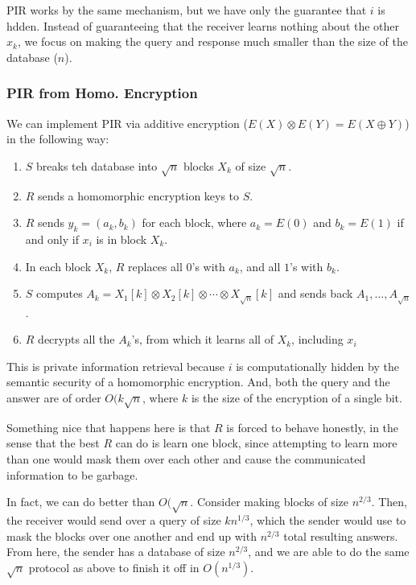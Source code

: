 \documentclass[11pt]{article}
\begin{document}
PIR works by the same mechanism, but we have only the guarantee that \(i\) is hdden.
Instead of guaranteeing that the receiver learns nothing about the other \(x_k\), 
we focus on making the query and response much smaller than the size of the database (\(n\)).

\subsubsection{PIR from Homo. Encryption}
We can implement PIR via additive encryption (\(E(X)\otimes E(Y) = E(X\oplus Y)\)) in the following way:
\begin{enumerate}
\item \(S\) breaks teh database into \(\sqrt{n}\) blocks \(X_k\) of size \(\sqrt{n}\).
\item \(R\) sends a homomorphic encryption keys to \(S\). 
\item \(R\) sends \(y_k = (a_k,b_k)\) for each block, where \(a_k=E(0)\) and \(b_k=E(1)\) if and only if \(x_i\) is in block \(X_k\).
\item In each block \(X_k\), \(R\) replaces all \(0\)'s with \(a_k\), and all \(1\)'s with \(b_k\).
\item \(S\) computes \(A_k = X_1[k]\otimes X_2[k]\otimes\cdots\otimes X_{\sqrt{n}}[k]\) and sends back \(A_1,\ldots,A_{\sqrt{n}}\).
\item \(R\) decrypts all the \(A_k\)'s, from which it learns all of \(X_k\), including \(x_i\)
\end{enumerate}

This is private information retrieval because \(i\) is computationally hidden by the semantic security of a homomorphic encryption.
And, both the query and the answer are of order \(O(k\sqrt{n}\), where \(k\) is the size of the encryption of a single bit.

Something nice that happens here is that \(R\) is forced to behave honestly, in the sense that the best \(R\) can do is learn one block,
since attempting to learn more than one would mask them over each other and cause the communicated information to be garbage.\bigskip

In fact, we can do better than \(O(\sqrt{n}\). Consider making blocks of size \(n^{2/3}\).
Then, the receiver would send over a query of size \(kn^{1/3}\), which the sender would use to mask the blocks over one another and end up with \(n^{2/3}\) total resulting answers.
From here, the sender has a database of size \(n^{2/3}\), and we are able to do the same \(\sqrt{n}\) protocol as above to finish it off in \(O(n^{1/3})\).
\end{document}
